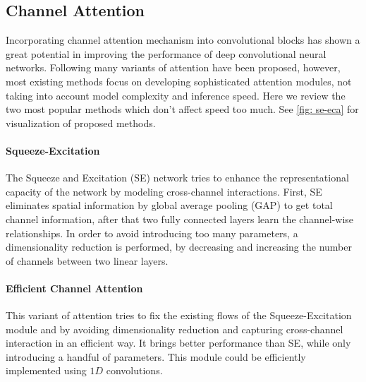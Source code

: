 \subsection{Channel Attention} \label{sec:channel-attn}
Incorporating channel attention mechanism \cite{hu2018_squeeze_SE} \cite{wang2020_eca} into convolutional blocks has shown a great potential in improving the performance of deep convolutional neural networks. %
Following \cite{hu2018_squeeze_SE} many variants of attention have been proposed, however, most existing methods focus on developing sophisticated attention modules, not taking into account model complexity and inference speed. Here we review the two most popular methods which don't affect speed too much. See \autoref{fig: se-eca} for visualization of proposed methods.

\paragraph{Squeeze-Excitation}
The Squeeze and Excitation (SE) network tries to enhance the representational capacity of the network by modeling cross-channel interactions. First, SE eliminates spatial information by global average pooling (GAP) to get total channel information, after that two fully connected layers learn the channel-wise relationships. In order to avoid introducing too many parameters, a dimensionality reduction is performed, by decreasing and increasing the number of channels between two linear layers. 


\paragraph{Efficient Channel Attention} This variant of attention tries to fix the existing flows of the Squeeze-Excitation module and by avoiding dimensionality reduction and capturing cross-channel interaction in an efficient way. It brings better performance than SE, while only introducing a handful of parameters. This module could be efficiently implemented using $1 D $ convolutions. 

